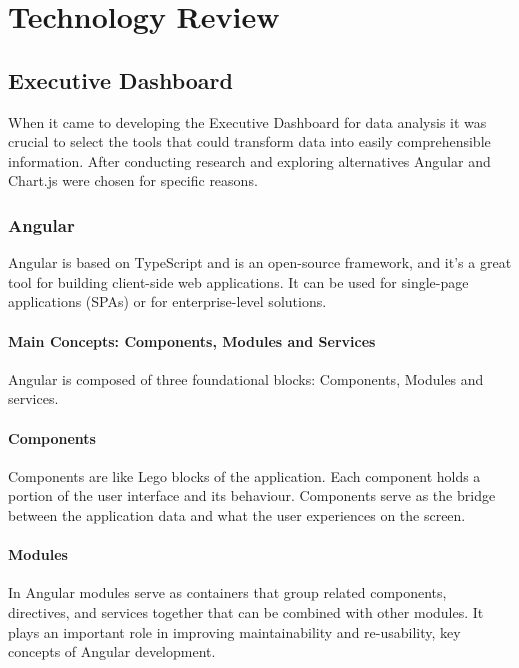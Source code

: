 \setlength{\headheight}{15pt}
\addtolength{\topmargin}{-2.5pt}

\chapter{Technology Review}

\section{Executive Dashboard}
When it came to developing the Executive Dashboard for data analysis it was crucial to select the tools that could transform data into easily comprehensible information. After conducting research and exploring alternatives Angular and Chart.js were chosen for specific reasons.

\subsection{Angular}
Angular is based on TypeScript and is an open-source framework, and it's a great tool for building client-side web applications. It can be used for single-page applications (SPAs) or for enterprise-level solutions. 

\subsubsection{Main Concepts: Components, Modules and Services}
Angular is composed of three foundational blocks: Components, Modules and services.

\subsubsection{Components} Components are like Lego blocks of the application. Each component holds a portion of the user interface and its behaviour. Components serve as the bridge between the application data and what the user experiences on the screen.\cite{angular-components}

\subsubsection{Modules} In Angular modules serve as containers that group related components, directives, and services together that can be combined with other modules. It plays an important role in improving maintainability and re-usability, key concepts of Angular development.\cite{angular-modules}

